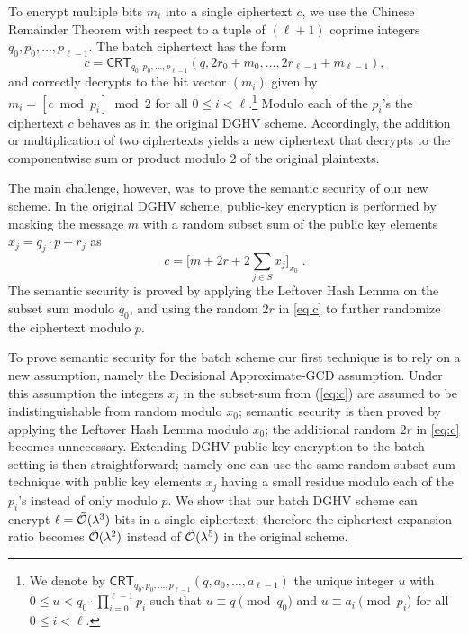 \documentclass{llncs}
\renewcommand\leq\leqslant
\newcommand{\Ot}[1]{{\cal \tilde O}(#1)}
\newcommand*{\crt}{\ensuremath{\mathsf{CRT}}}
\begin{document}
To encrypt multiple bits $m_i$ into a single
ciphertext $c$, we use the Chinese Remainder
Theorem with respect to a tuple of $(\ell+1)$ coprime integers $q_0,p_0,\ldots,p_{\ell-1}$. The batch ciphertext has the form
\[ c = \crt_{q_0,p_0,\ldots,p_{\ell-1}}(q, 2r_0+m_0,\ldots,2r_{\ell-1}+m_{\ell-1}), \]
and correctly decrypts to the bit vector $(m_i)$ given by $m_i=[c \bmod p_i]\bmod 2$ for all $0 \leq i < \ell$.\footnote{We denote by 
$\crt_{q_0,p_0,\ldots,p_{\ell-1}}(q,a_0,\ldots,a_{\ell-1})$ the unique
  integer $u$ with $0 \leq u <q_0\cdot\prod_{i=0}^{\ell-1} p_i$ such
  that $u \equiv q \pmod{q_0}$ and $u \equiv a_i \pmod{p_i}$ for
  all $0 \leq i < \ell$.} Modulo each of the $p_i$'s the
ciphertext $c$ behaves as in the original DGHV scheme. Accordingly, the
addition or multiplication of two ciphertexts yields a new ciphertext
that decrypts to the componentwise sum or product modulo $2$ of the original
plaintexts.


The main challenge, however, was to prove the semantic security of our new scheme. In the original DGHV scheme, public-key encryption is
performed by masking the message $m$ with a random subset sum of the
public key elements $x_j=q_j \cdot p + r_j$ as
\begin{equation}
\label{eq:c}
c = \bigg[ m+2r+2 \sum\limits_{j \in S} x_j \bigg]_{x_0}\;.
\end{equation}
The semantic security is proved by applying the Leftover Hash Lemma on
the subset sum modulo $q_0$, and using the random $2r$ in \eqref{eq:c} to further
randomize the ciphertext modulo $p$.

To prove semantic security for the batch scheme our first technique 
is to rely on a new assumption, namely the Decisional Approximate-GCD 
assumption. Under this assumption the integers $x_j$ in the subset-sum
from (\ref{eq:c}) are assumed to be indistinguishable from random
modulo $x_0$; semantic security is then proved by applying the Leftover
Hash Lemma modulo $x_0$; the additional random $2r$ in \eqref{eq:c} becomes
unnecessary. Extending DGHV public-key
encryption to the batch setting is then straightforward; namely one can use
the same random subset sum technique with
public key elements $x_j$ having a small residue modulo each of the $p_i$'s
instead of only modulo $p$. We show that our batch DGHV scheme
can encrypt $\ell=\Ot{\lambda^3}$ bits in a single ciphertext; therefore
the ciphertext expansion ratio becomes $\Ot{\lambda^2}$ instead of
$\Ot{\lambda^5}$ in the original scheme.
\end{document}
